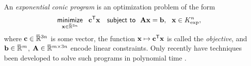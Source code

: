 \documentclass[twoside]{article}
\begin{document}
An \emph{exponential conic program} is an optimization problem of the form
\begin{equation}
    \mathop{\text{\sf minimize}}\limits_{\mathbf{x} \in \mskip1mu\overline{\mskip-1mu\mathbb R\!}\,^{3n}}~~ \mathbf{c}^{\sf T} \mathbf{x}
    \quad\text{\sf subject to}~~ \mathbf{A} \mathbf{x} = \mathbf{b},~~\mathbf{x} \in K_{\exp}^n,
        \label{eq:exp-conic-program}
\end{equation}
where $\mathbf{c} \in \mskip1mu\overline{\mskip-1mu\mathbb R\!}\,^{3n}$ is some vector,
 the function $\mathbf{x} \mapsto \mathbf{c}^{\sf T} \mathbf{x}$ is called the \emph{objective},
and $\mathbf{b} \in \mskip1mu\overline{\mskip-1mu\mathbb R\!}\,^m$, $\mathbf{A} \in \mskip1mu\overline{\mskip-1mu\mathbb R\!}\,^{m \times 3n}$ encode linear constraints.
%
Only recently have techniques
 been developed to solve such programs in polynomial time \parencite{badenbroek2021algorithm,dahl2022primal}.
\end{document}
